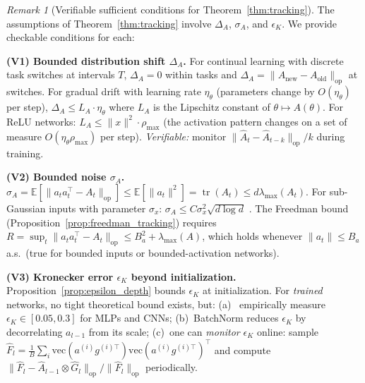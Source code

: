 \documentclass{article}
\providecommand{\E}{\mathbb{E}}
\providecommand{\norm}[1]{\lVert #1 \rVert}
\DeclareMathOperator{\tr}{tr}
\theoremstyle{plain}
\theoremstyle{definition}
\theoremstyle{remark}
\newtheorem{remark}{Remark}
\begin{document}
\begin{remark}[Verifiable sufficient conditions for Theorem~\ref{thm:tracking}]
\label{rem:verify_tracking}
The assumptions of Theorem~\ref{thm:tracking} involve $\Delta_A$, $\sigma_A$, and $\epsilon_K$. We provide checkable conditions for each:

\textbf{(V1) Bounded distribution shift $\Delta_A$.} For continual learning with discrete task switches at intervals $T$, $\Delta_A = 0$ within tasks and $\Delta_A = \norm{A_{\mathrm{new}} - A_{\mathrm{old}}}_{\mathrm{op}}$ at switches. For gradual drift with learning rate $\eta_\theta$ (parameters change by $O(\eta_\theta)$ per step), $\Delta_A \leq L_A \cdot \eta_\theta$ where $L_A$ is the Lipschitz constant of $\theta \mapsto A(\theta)$. For ReLU networks: $L_A \leq \norm{x}^2 \cdot \rho_{\max}$ (the activation pattern changes on a set of measure $O(\eta_\theta \rho_{\max})$ per step). \emph{Verifiable:} monitor $\norm{\hat{A}_t - \hat{A}_{t-k}}_{\mathrm{op}}/k$ during training.

\textbf{(V2) Bounded noise $\sigma_A$.} $\sigma_A = \E[\norm{a_t a_t^\top - A_t}_{\mathrm{op}}] \leq \E[\norm{a_t}^2] = \tr(A_t) \leq d\lambda_{\max}(A_t)$. For sub-Gaussian inputs with parameter $\sigma_x$: $\sigma_A \leq C\sigma_x^2\sqrt{d\log d}$ \citep{vershynin2018high}. The Freedman bound (Proposition~\ref{prop:freedman_tracking}) requires $R = \sup_t\norm{a_t a_t^\top - A_t}_{\mathrm{op}} \leq B_a^2 + \lambda_{\max}(A)$, which holds whenever $\norm{a_t} \leq B_a$ a.s.\ (true for bounded inputs or bounded-activation networks).

\textbf{(V3) Kronecker error $\epsilon_K$ beyond initialization.} Proposition~\ref{prop:epsilon_depth} bounds $\epsilon_K$ at initialization. For \emph{trained} networks, no tight theoretical bound exists, but: (a)~\citet{kunstner2019limitations} empirically measure $\epsilon_K \in [0.05, 0.3]$ for MLPs and CNNs; (b)~BatchNorm reduces $\epsilon_K$ by decorrelating $a_{l-1}$ from its scale; (c)~one can \emph{monitor} $\epsilon_K$ online: sample $\hat{F}_l = \frac{1}{B}\sum_i \mathrm{vec}(a^{(i)} g^{(i)\top})\mathrm{vec}(a^{(i)} g^{(i)\top})^\top$ and compute $\norm{\hat{F}_l - \hat{A}_{l-1} \otimes \hat{G}_l}_{\mathrm{op}} / \norm{\hat{F}_l}_{\mathrm{op}}$ periodically.
\end{remark}
\end{document}

